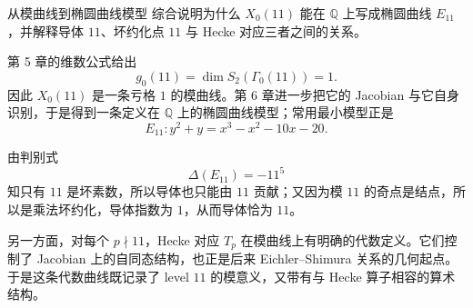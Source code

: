 \begin{problem}{从模曲线到椭圆曲线模型}
\hard
综合说明为什么 $X_0(11)$ 能在 $\mathbb{Q}$ 上写成椭圆曲线 $E_{11}$，并解释导体 $11$、坏约化点 $11$ 与 Hecke 对应三者之间的关系。
\end{problem}
\begin{solution}
第 5 章的维数公式给出
\[
g_0(11)=\dim S_2(\Gamma_0(11))=1.
\]
因此 $X_0(11)$ 是一条亏格 $1$ 的模曲线。第 6 章进一步把它的 Jacobian 与它自身识别，于是得到一条定义在 $\mathbb{Q}$ 上的椭圆曲线模型；常用最小模型正是
\[
E_{11}: y^2+y=x^3-x^2-10x-20.
\]

由判别式
\[
\Delta(E_{11})=-11^5
\]
知只有 $11$ 是坏素数，所以导体也只能由 $11$ 贡献；又因为模 $11$ 的奇点是结点，所以是乘法坏约化，导体指数为 $1$，从而导体恰为 $11$。

另一方面，对每个 $p\nmid 11$，Hecke 对应 $T_p$ 在模曲线上有明确的代数定义。它们控制了 Jacobian 上的自同态结构，也正是后来 Eichler--Shimura 关系的几何起点。于是这条代数曲线既记录了 level $11$ 的模意义，又带有与 Hecke 算子相容的算术结构。
\end{solution}
